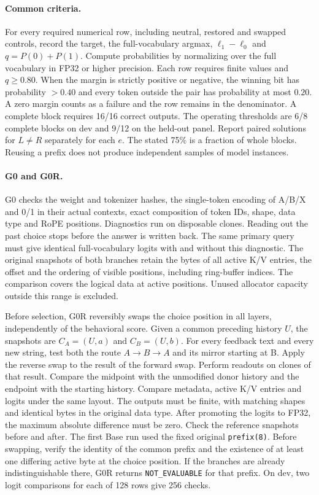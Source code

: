 \paragraph{Common criteria.}
For every required numerical row, including neutral, restored and swapped controls, record the target, the full-vocabulary argmax, $\ell_1-\ell_0$ and $q=P(0)+P(1)$. Compute probabilities by normalizing over the full vocabulary in FP32 or higher precision. Each row requires finite values and $q\ge 0.80$. When the margin is strictly positive or negative, the winning bit has probability $>0.40$ and every token outside the pair has probability at most $0.20$. A zero margin counts as a failure and the row remains in the denominator. A complete block requires 16/16 correct outputs. The operating thresholds are 6/8 complete blocks on dev and 9/12 on the held-out panel. Report paired solutions for $L\ne R$ separately for each $e$. The stated 75\% is a fraction of whole blocks. Reusing a prefix does not produce independent samples of model instances.

\paragraph{G0 and G0R.}
G0 checks the weight and tokenizer hashes, the single-token encoding of A/B/X and 0/1 in their actual contexts, exact composition of token IDs, shape, data type and RoPE positions. Diagnostics run on disposable clones. Reading out the past choice stops before the answer is written back. The same primary query must give identical full-vocabulary logits with and without this diagnostic. The original snapshots of both branches retain the bytes of all active K/V entries, the offset and the ordering of visible positions, including ring-buffer indices. The comparison covers the logical data at active positions. Unused allocator capacity outside this range is excluded.

Before selection, G0R reversibly swaps the choice position in all layers, independently of the behavioral score. Given a common preceding history $U$, the snapshots are $C_A=(U,a)$ and $C_B=(U,b)$. For every feedback text and every new string, test both the route $A\to B\to A$ and its mirror starting at B. Apply the reverse swap to the result of the forward swap. Perform readouts on clones of that result. Compare the midpoint with the unmodified donor history and the endpoint with the starting history. Compare metadata, active K/V entries and logits under the same layout. The outputs must be finite, with matching shapes and identical bytes in the original data type. After promoting the logits to FP32, the maximum absolute difference must be zero. Check the reference snapshots before and after. The first Base run used the fixed original \texttt{prefix(8)}. Before swapping, verify the identity of the common prefix and the existence of at least one differing active byte at the choice position. If the branches are already indistinguishable there, G0R returns \texttt{NOT\_EVALUABLE} for that prefix. On dev, two logit comparisons for each of 128 rows give 256 checks.

